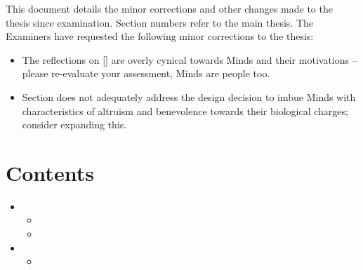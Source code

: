 \documentclass[hidelinks,a4paper,11pt,openany]{article}
\begin{document}
This document details the minor corrections and other changes made to the thesis since examination. Section numbers refer to the main thesis.  The Examiners have requested the following minor corrections to the thesis:
\begin{itemize}[topsep=0pt, itemsep=8pt]
	\item The reflections on  [] are overly cynical towards Minds and their motivations -- please re-evaluate your assessment, Minds are people too.
	\item Section  does not adequately address the design decision to imbue Minds with characteristics of	
	altruism and benevolence towards their biological charges; consider expanding this.
\end{itemize}



%

\section*{Contents}
\begin{itemize}
	\item {}
	\vspace{0.6em}
	\begin{itemize}
		\item {}
		\item {}
	\end{itemize}
	\vspace{0.8em}
	\item {}
	\vspace{0.6em}
	\begin{itemize}
		\item {}
	\end{itemize}
	
\end{itemize}

\clearpage
\end{document}
